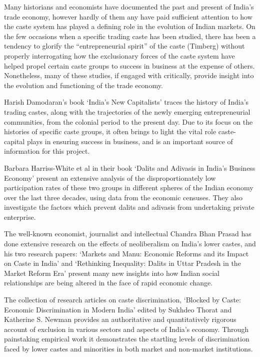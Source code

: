 \documentclass[12pt,a4paper,titlepage]{report}
\begin{document}
Many historians and economists have documented the past and present of
India's trade economy, however hardly of them any have paid sufficient
attention to how the caste system has played a defining role in the
evolution of Indian markets. On the few occasions when a specific
trading caste has been studied, there has been a tendency to glorify the
``entrepreneurial spirit'' of the caste (Timberg) without properly
interrogating how the exclusionary forces of the caste system have
helped propel certain caste groups to success in business at the expense
of others. Nonetheless, many of these studies, if engaged with
critically, provide insight into the evolution and functioning of the
trade economy.

Harish Damodaran's book `India's New Capitalists' traces the history of
India's trading castes, along with the trajectories of the newly
emerging entrepreneurial communities, from the colonial period to the
present day. Due to its focus on the histories of specific caste groups,
it often brings to light the vital role caste-capital plays in ensuring
success in business, and is an important source of information for this
project.

Barbara Harriss-White et al in their book `Dalits and Adivasis in
India's Business Economy' present an extensive analysis of the
disproportionately low participation rates of these two groups in
different spheres of the Indian economy over the last three decades,
using data from the economic censuses. They also investigate the factors
which prevent dalits and adivasis from undertaking private enterprise.

The well-known economist, journalist and intellectual Chandra Bhan
Prasad has done extensive research on the effects of neoliberalism on
India's lower castes, and his two research papers: `Markets and Manu:
Economic Reforms and its Impact on Caste in India' and `Rethinking
Inequality: Dalits in Uttar Pradesh in the Market Reform Era' present
many new insights into how Indian social relationships are being altered
in the face of rapid economic change.

The collection of research articles on caste discrimination, `Blocked by
Caste: Economic Discrimination in Modern India' edited by Sukhdeo Thorat
and Katherine S. Newman provides an authoritative and quantitatively
rigorous account of exclusion in various sectors and aspects of India's
economy. Through painstaking empirical work it demonstrates the
startling levels of discrimination faced by lower castes and minorities
in both market and non-market institutions.
\end{document}
